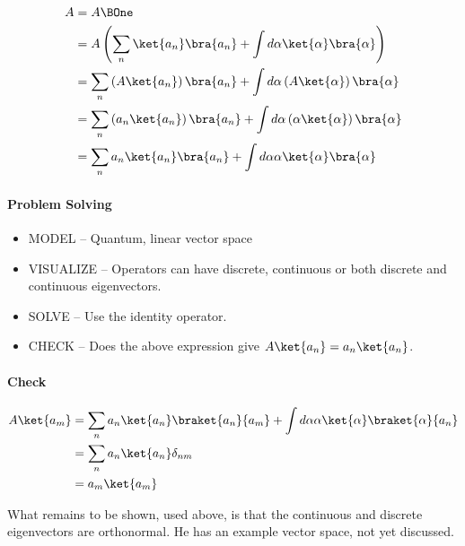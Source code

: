 \begin{equation}\label{eqn:lecture8makingSenseOfQM:1060}
\begin{aligned}
A &= A \BOne \\
&= A \left( \sum_n \ket{a_n} \bra{a_n} + \int d\alpha \ket{\alpha} \bra{\alpha} \right) \\
&= \sum_n \left(A \ket{a_n} \right)\bra{a_n} + \int d\alpha \left(A \ket{\alpha} \right)\bra{\alpha} \\
&= \sum_n \left(a_n \ket{a_n}\right) \bra{a_n} + \int d\alpha \left(\alpha \ket{\alpha}\right) \bra{\alpha} \\
&= \sum_n a_n \ket{a_n} \bra{a_n} + \int d\alpha \alpha \ket{\alpha} \bra{\alpha}
\end{aligned}
\end{equation}

\paragraph{Problem Solving}

\begin{itemize}
\item MODEL -- Quantum, linear vector space
\item VISUALIZE -- Operators can have discrete, continuous or both discrete and continuous eigenvectors.
\item SOLVE -- Use the identity operator.
\item CHECK -- Does the above expression give \(A \ket{a_n} = a_n \ket{a_n}\).
\end{itemize}

\paragraph{Check}

\begin{equation}\label{eqn:lecture8makingSenseOfQM:1080}
\begin{aligned}
A \ket{a_m}
&= \sum_n a_n \ket{a_n} \braket{a_n}{a_m} + \int d\alpha \alpha \ket{\alpha} \braket{\alpha}{a_n} \\
&= \sum_n a_n \ket{a_n} \delta_{nm} \\
&= a_m \ket{a_m}
\end{aligned}
\end{equation}

What remains to be shown, used above, is that the continuous and discrete eigenvectors are orthonormal.  He has an example vector space, not yet discussed.

